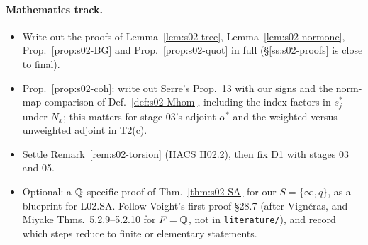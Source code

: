 \paragraph{Mathematics track.}
\begin{itemize}
\item[M02.1] Write out the proofs of Lemma~\ref{lem:s02-tree}, Lemma~\ref{lem:s02-normone}, Prop.~\ref{prop:s02-BG}
  and Prop.~\ref{prop:s02-quot} in full (\S\ref{ss:s02-proofs} is close to final).
\item[M02.2] Prop.~\ref{prop:s02-coh}: write out Serre's Prop.~13 with our signs and the norm-map comparison of
  Def.~\ref{def:s02-Mhom}, including the index factors in $s_j^*$ under $N_x$; this matters for stage 03's adjoint
  $\alpha^*$ and the weighted versus unweighted adjoint in T2(c).
\item[M02.3] Settle Remark~\ref{rem:s02-torsion} (HACS H02.2), then fix D1 with stages 03 and 05.
\item[M02.4] Optional: a $\mathbb{Q}$-specific proof of Thm.~\ref{thm:s02-SA} for our $S=\{\infty,q\}$, as a blueprint
  for L02.SA. Follow Voight's first proof \S28.7 (after Vignéras, and Miyake Thms.~5.2.9--5.2.10 for $F=\mathbb{Q}$, not in
  \texttt{literature/}), and record which steps reduce to finite or elementary statements.
\end{itemize}

